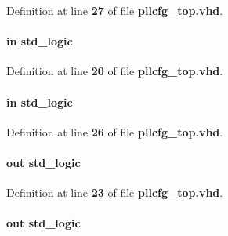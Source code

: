 Definition at line {\bf 27} of file {\bf pllcfg\+\_\+top.\+vhd}.

\paragraph[{sdinA}]{ {\bfseries \textcolor{keywordflow}{in}\textcolor{vhdlchar}{ }} {\bfseries \textcolor{comment}{std\+\_\+logic}\textcolor{vhdlchar}{ }} \hspace{0.3cm}{\ttfamily [Port]}}\label{classpllcfg__top_a32ae4568fc0796a3f7dd9ba108f79156}


Definition at line {\bf 20} of file {\bf pllcfg\+\_\+top.\+vhd}.

\paragraph[{sdinB}]{ {\bfseries \textcolor{keywordflow}{in}\textcolor{vhdlchar}{ }} {\bfseries \textcolor{comment}{std\+\_\+logic}\textcolor{vhdlchar}{ }} \hspace{0.3cm}{\ttfamily [Port]}}\label{classpllcfg__top_afa158f403175296212e3fa64da774b90}


Definition at line {\bf 26} of file {\bf pllcfg\+\_\+top.\+vhd}.

\paragraph[{sdoutA}]{ {\bfseries \textcolor{keywordflow}{out}\textcolor{vhdlchar}{ }} {\bfseries \textcolor{comment}{std\+\_\+logic}\textcolor{vhdlchar}{ }} \hspace{0.3cm}{\ttfamily [Port]}}\label{classpllcfg__top_a1dc6f5e11071716113a4ad7698740deb}


Definition at line {\bf 23} of file {\bf pllcfg\+\_\+top.\+vhd}.

\paragraph[{sdoutB}]{ {\bfseries \textcolor{keywordflow}{out}\textcolor{vhdlchar}{ }} {\bfseries \textcolor{comment}{std\+\_\+logic}\textcolor{vhdlchar}{ }} \hspace{0.3cm}{\ttfamily [Port]}}\label{classpllcfg__top_a66a0c39b8b3d13e6cc7ded78cb5176eb}


